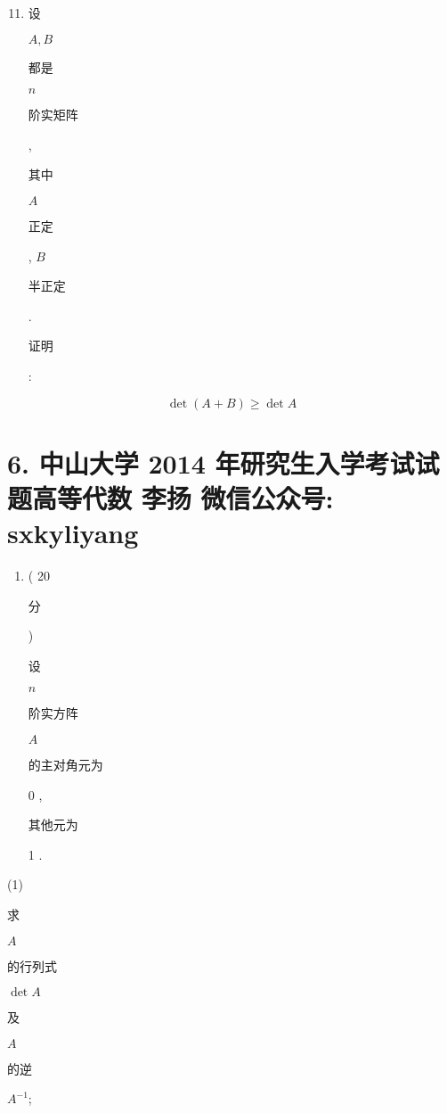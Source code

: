 \documentclass[10pt]{article}
\begin{document}
\begin{enumerate}
  \setcounter{enumi}{10}
  \item \begin{CJK}{UTF8}{mj}设\end{CJK} $A, B$ \begin{CJK}{UTF8}{mj}都是\end{CJK} $n$ \begin{CJK}{UTF8}{mj}阶实矩阵\end{CJK}, \begin{CJK}{UTF8}{mj}其中\end{CJK} $A$ \begin{CJK}{UTF8}{mj}正定\end{CJK}, $B$ \begin{CJK}{UTF8}{mj}半正定\end{CJK}. \begin{CJK}{UTF8}{mj}证明\end{CJK}:
\end{enumerate}
$$
\operatorname{det}(A+B) \geq \operatorname{det} A
$$

\section{6. 中山大学 2014 年研究生入学考试试题高等代数 
 李扬 
 微信公众号: sxkyliyang}
\begin{enumerate}
  \item ( 20 \begin{CJK}{UTF8}{mj}分\end{CJK}) \begin{CJK}{UTF8}{mj}设\end{CJK} $n$ \begin{CJK}{UTF8}{mj}阶实方阵\end{CJK} $A$ \begin{CJK}{UTF8}{mj}的主对角元为\end{CJK} 0 , \begin{CJK}{UTF8}{mj}其他元为\end{CJK} 1 .
\end{enumerate}
(1) \begin{CJK}{UTF8}{mj}求\end{CJK} $A$ \begin{CJK}{UTF8}{mj}的行列式\end{CJK} $\operatorname{det} A$ \begin{CJK}{UTF8}{mj}及\end{CJK} $A$ \begin{CJK}{UTF8}{mj}的逆\end{CJK} $A^{-1}$;
\end{document}
